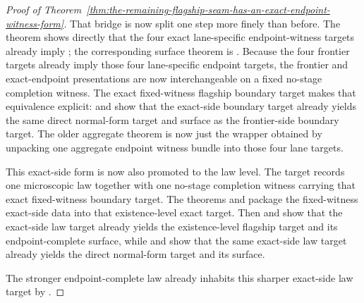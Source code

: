 \begin{proof}[Proof of Theorem~\ref{thm:the-remaining-flagship-seam-has-an-exact-endpoint-witness-form}]
That bridge is now split one step more finely than before. The theorem
shows directly that the four exact lane-specific endpoint-witness targets
already imply ; the corresponding
surface theorem is
.
Because the four frontier targets already imply those four lane-specific
endpoint targets, the frontier and exact-endpoint presentations are now
interchangeable on a fixed no-stage completion witness.
The exact fixed-witness flagship boundary target makes that equivalence
explicit: 
and
show that the exact-side boundary target already yields the same direct
normal-form target and surface as the frontier-side boundary target.
The older aggregate theorem
is now just the wrapper obtained by unpacking one aggregate endpoint witness
bundle into those four lane targets.

This exact-side form is now also promoted to the law level. The target
 records one microscopic law together
with one no-stage completion witness carrying that exact fixed-witness
boundary target. The theorems
and
package the fixed-witness exact-side data into that existence-level exact
target. Then
and
show that the exact-side law target already yields the existence-level
flagship target and its endpoint-complete surface, while
and
show that the same exact-side law target already yields the direct normal-form
target and its surface.

The stronger endpoint-complete law already inhabits this sharper exact-side
law target by
.
\end{proof}

